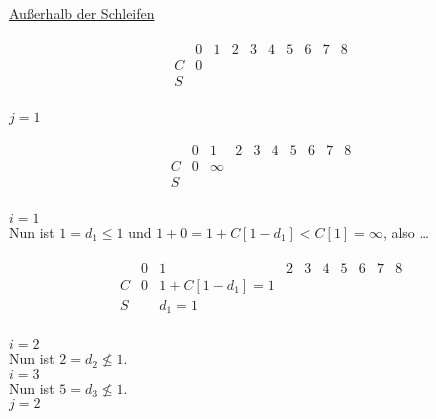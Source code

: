 \begin{solution}
\begin{enumerate}[label = \alph*)]
\begin{enumerate}[label = \arabic*.]
    \underline{Außerhalb der Schleifen}

    \begin{align*}
      \begin{array}{c|c|c|c|c|c|c|c|c|c}
          & 0 & 1 & 2 & 3 & 4 & 5 & 6 & 7 & 8 \\ \hline
        C & 0 &   &   &   &   &   &   &   &   \\ \hline
        S &   &   &   &   &   &   &   &   &   \\
      \end{array}
    \end{align*}

    \underline{$j = 1$}

    \begin{align*}
      \begin{array}{c|c|c|c|c|c|c|c|c|c}
          & 0 & 1      & 2 & 3 & 4 & 5 & 6 & 7 & 8 \\ \hline
        C & 0 & \infty &   &   &   &   &   &   &   \\ \hline
        S &   &        &   &   &   &   &   &   &   \\
      \end{array}
    \end{align*}

    \underline{$i = 1$} \\
    Nun ist $1 = d_1 \leq 1$ und $1 + 0 = 1 + C[1 - d_1] < C[1] = \infty$, also …

    \begin{align*}
      \begin{array}{c|c|c|c|c|c|c|c|c|c}
          & 0 & 1                  & 2 & 3 & 4 & 5 & 6 & 7 & 8 \\ \hline
        C & 0 & 1 + C[1 - d_1] = 1 &   &   &   &   &   &   &   \\ \hline
        S &   & d_1 = 1            &   &   &   &   &   &   &   \\
      \end{array}
    \end{align*}

    \underline{$i = 2$} \\
    Nun ist $2 = d_2 \not \leq 1$. \\

    \underline{$i = 3$} \\
    Nun ist $5 = d_3 \not \leq 1$. \\

    \underline{$j = 2$} \\


\end{enumerate}
\end{enumerate}
\end{solution}
